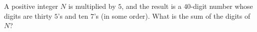 A positive integer $N$ is multiplied by $5$, and the result is a $40$-digit number whose digits are thirty $5$'s and ten $7$'s (in some order). What is the sum of the digits of $N$?

